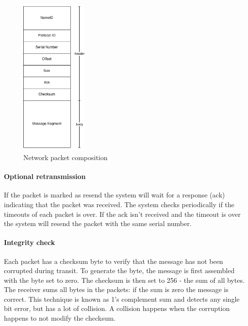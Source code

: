 \documentclass[12pt]{article}
\begin{document}
\begin{figure}[H]
\begin{center}
\includegraphics[height=8cm]{packet}
\end{center}
\caption{Network packet composition}
\end{figure}

\paragraph{Optional retransmission}
If the packet is marked as resend the system will wait for a response (ack) indicating that the packet was received. The system checks periodically if the timeouts of each packet is over. If the ack isn't received and the timeout is over the system will resend the packet with the same serial number.

\paragraph{Integrity check}
Each packet has a checksum byte to verify that the message has not been corrupted during transit. To generate the byte, the message is first assembled with the byte set to zero. The checksum is then set to 256 - the sum of all bytes. The receiver sums all bytes in the packets: if the sum is zero the message is correct. This technique is known as 1's complement sum \cite{checksum} and detects any single bit error, but has a lot of collision. A collision happens when the corruption happens to not modify the checksum.

\clearpage
\end{document}
